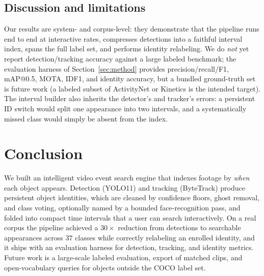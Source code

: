 \documentclass[conference]{IEEEtran}
\begin{document}
\subsection{Discussion and limitations}
Our results are system- and corpus-level: they demonstrate that the
pipeline runs end to end at interactive rates, compresses detections
into a faithful interval index, spans the full label set, and performs
identity relabeling. We do \emph{not} yet report detection/tracking
accuracy against a large labeled benchmark; the evaluation harness of
Section~\ref{sec:method} provides precision/recall/F1, mAP@0.5, MOTA,
IDF1, and identity accuracy, but a bundled ground-truth set is future
work (a labeled subset of ActivityNet or Kinetics is the intended
target). The interval builder also inherits the detector's and tracker's
errors: a persistent ID switch would split one appearance into two
intervals, and a systematically missed class would simply be absent from
the index.

\section{Conclusion}
We built an intelligent video event search engine that indexes footage
by \emph{when} each object appears. Detection (YOLO11) and tracking
(ByteTrack) produce persistent object identities, which are cleaned by
confidence floors, ghost removal, and class voting, optionally named by
a bounded face-recognition pass, and folded into compact time intervals
that a user can search interactively. On a real corpus the pipeline
achieved a $30\times$ reduction from detections to searchable
appearances across $37$ classes while correctly relabeling an enrolled
identity, and it ships with an evaluation harness for detection,
tracking, and identity metrics. Future work is a large-scale labeled
evaluation, export of matched clips, and open-vocabulary queries for
objects outside the COCO label set.
\end{document}

